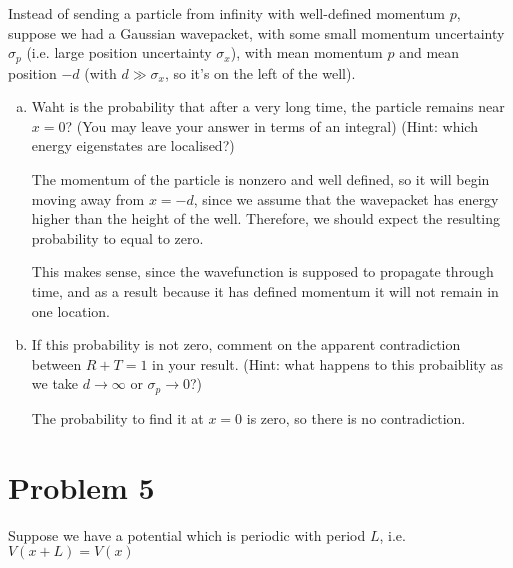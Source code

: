 \documentclass{article}
\begin{document}
    Instead of sending a particle from infinity with well-defined momentum $p$, suppose we had a Gaussian wavepacket, with some small momentum uncertainty $\sigma_p$ (i.e. large position uncertainty $\sigma_x$), with mean momentum $p$ and mean position $-d$ (with $d \gg \sigma_x$, so it's on the left of the well).


    \begin{enumerate}[(a)]
        \item Waht is the probability that after a very long time, the particle remains near $x = 0$? (You may leave your answer in terms of an integral) (Hint: which energy eigenstates are localised?)
        
        \begin{solution}
            The momentum of the particle is nonzero and well defined, so it will begin moving away from $x = -d$, since we assume that the wavepacket has energy higher than the height of the well. Therefore, we should expect the resulting probability to equal to zero.


            This makes sense, since the wavefunction is supposed to propagate through time, and as a result because it has defined momentum it will not remain in one location. 
        \end{solution}
        \item If this probability is not zero, comment on the apparent contradiction between $R + T = 1$ in your result. (Hint: what happens to this probaiblity as we take $d \to \infty$ or $\sigma_p \to 0$?)
        
        \begin{solution}
            The probability to find it at $x = 0$ is zero, so there is no contradiction.
        \end{solution}
    \end{enumerate}

    \pagebreak
    \section*{Problem 5}

    Suppose we have a potential which is periodic with period $L$, i.e. $V(x + L) = V(x)$
\end{document}
